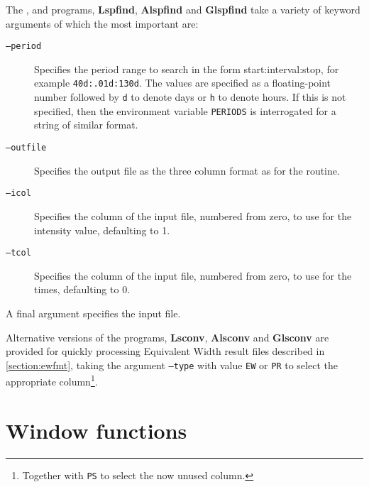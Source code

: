 The {\scipy}, {\astroml} and {\gatspy} programs, \textbf{Lspfind}, \textbf{Alspfind} and \textbf{Glspfind} take a
variety of keyword arguments of which the most important are:

\begin{description}

\item[\tt{--period}] Specifies the period range to search in the form start:interval:stop, for example
  \texttt{40d:.01d:130d}. The values are specified as a floating-point number followed by \texttt{d} to denote days or \texttt{h} to
  denote hours. If this is not specified, then the environment variable \texttt{PERIODS} is interrogated for a string of
  similar format.

\item[\tt{--outfile}] Specifies the output file as the three column format as for the {\numrecs} routine.

\item[\tt{--icol}] Specifies the column of the input file, numbered from zero, to use for the intensity value, defaulting to
  1.

\item[\tt{--tcol}] Specifies the column of the input file, numbered from zero, to use for the times, defaulting to 0.

\end{description}

A final argument specifies the input file.

Alternative versions of the programs, \textbf{Lsconv}, \textbf{Alsconv} and \textbf{Glsconv} are provided for quickly
processing Equivalent Width result files described in \ref{section:ewfmt}, taking the argument \texttt{--type} with value \texttt{EW} or \texttt{PR} to
select the appropriate column\footnote{Together with \texttt{PS} to select the now unused column.}.

\section{Window functions}

